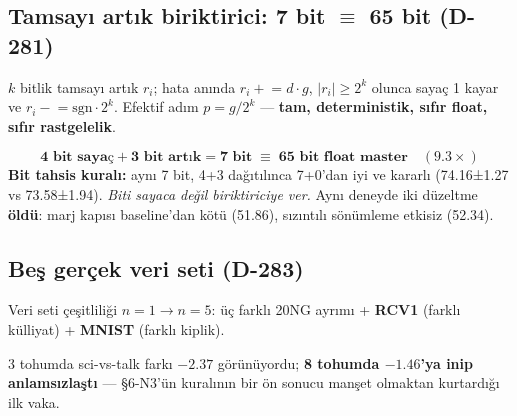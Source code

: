 \documentclass[11pt]{article}
\begin{document}
\subsection*{Tamsayı artık biriktirici: 7 bit $\equiv$ 65 bit (D-281)}
$k$ bitlik tamsayı artık $r_i$; hata anında $r_i \mathrel{+}= d\cdot g$, $\lvert r_i\rvert\ge2^k$ olunca sayaç 1 kayar ve $r_i \mathrel{-}= \mathrm{sgn}\cdot2^k$. Efektif adım $p=g/2^k$ — \textbf{tam, deterministik, sıfır float, sıfır rastgelelik}.
\begin{center}\small{}\end{center}
\[\textbf{4 bit sayaç} + \textbf{3 bit artık} = \textbf{7 bit} \;\equiv\; \textbf{65 bit float master}\quad(9.3\times)\]
\textbf{Bit tahsis kuralı:} aynı 7 bit, 4+3 dağıtılınca 7+0'dan iyi ve kararlı (74.16±1.27 vs 73.58±1.94). \emph{Biti sayaca değil biriktiriciye ver.}  Aynı deneyde iki düzeltme \textbf{öldü}: marj kapısı baseline'dan kötü (51.86), sızıntılı sönümleme etkisiz (52.34).
\subsection*{Beş gerçek veri seti (D-283)}
Veri seti çeşitliliği $n{=}1 \to n{=}5$: üç farklı 20NG ayrımı + \textbf{RCV1} (farklı külliyat) + \textbf{MNIST} (farklı kiplik).
\begin{center}\small{}\end{center}
3 tohumda sci-vs-talk farkı $-2.37$ görünüyordu; \textbf{8 tohumda $-1.46$'ya inip anlamsızlaştı} — §6-N3'ün kuralının bir ön sonucu manşet olmaktan kurtardığı ilk vaka.
\end{document}
